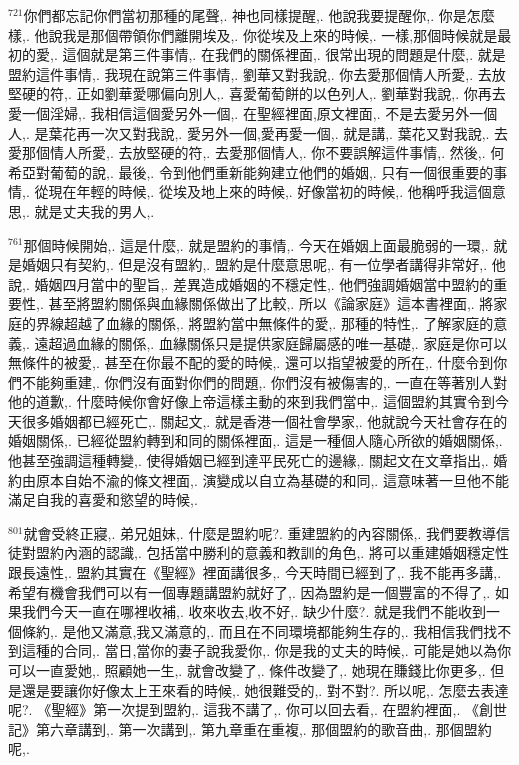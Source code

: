 \documentclass{book}
\begin{document}
$^{721}$你們都忘記你們當初那種的尾聲,.
神也同樣提醒,.
他說我要提醒你,.
你是怎麼樣,.
他說我是那個帶領你們離開埃及,.
你從埃及上來的時候,.
一樣,那個時候就是最初的愛,.
這個就是第三件事情,.
在我們的關係裡面,.
很常出現的問題是什麼,.
就是盟約這件事情,.
我現在說第三件事情,.
劉華又對我說,.
你去愛那個情人所愛,.
去放堅硬的符,.
正如劉華愛哪偏向別人,.
喜愛葡萄餅的以色列人,.
劉華對我說,.
你再去愛一個淫婦,.
我相信這個愛另外一個,.
在聖經裡面,原文裡面,.
不是去愛另外一個人,.
是葉花再一次又對我說,.
愛另外一個,愛再愛一個,.
就是講,.
葉花又對我說,.
去愛那個情人所愛,.
去放堅硬的符,.
去愛那個情人,.
你不要誤解這件事情,.
然後,.
何希亞對葡萄的說,.
最後,.
令到他們重新能夠建立他們的婚姻,.
只有一個很重要的事情,.
從現在年輕的時候,.
從埃及地上來的時候,.
好像當初的時候,.
他稱呼我這個意思,.
就是丈夫我的男人,.

$^{761}$那個時候開始,.
這是什麼,.
就是盟約的事情,.
今天在婚姻上面最脆弱的一環,.
就是婚姻只有契約,.
但是沒有盟約,.
盟約是什麼意思呢,.
有一位學者講得非常好,.
他說,.
婚姻四月當中的聖旨,.
差異造成婚姻的不穩定性,.
他們強調婚姻當中盟約的重要性,.
甚至將盟約關係與血緣關係做出了比較,.
所以《論家庭》這本書裡面,.
將家庭的界線超越了血緣的關係,.
將盟約當中無條件的愛,.
那種的特性,.
了解家庭的意義,.
遠超過血緣的關係,.
血緣關係只是提供家庭歸屬感的唯一基礎,.
家庭是你可以無條件的被愛,.
甚至在你最不配的愛的時候,.
還可以指望被愛的所在,.
什麼令到你們不能夠重建,.
你們沒有面對你們的問題,.
你們沒有被傷害的,.
一直在等著別人對他的道歉,.
什麼時候你會好像上帝這樣主動的來到我們當中,.
這個盟約其實令到今天很多婚姻都已經死亡,.
關起文,.
就是香港一個社會學家,.
他就說今天社會存在的婚姻關係,.
已經從盟約轉到和同的關係裡面,.
這是一種個人隨心所欲的婚姻關係,.
他甚至強調這種轉變,.
使得婚姻已經到達平民死亡的邊緣,.
關起文在文章指出,.
婚約由原本自始不渝的條文裡面,.
演變成以自立為基礎的和同,.
這意味著一旦他不能滿足自我的喜愛和慾望的時候,.

$^{801}$就會受終正寢,.
弟兄姐妹,.
什麼是盟約呢?.
重建盟約的內容關係,.
我們要教導信徒對盟約內涵的認識,.
包括當中勝利的意義和教訓的角色,.
將可以重建婚姻穩定性跟長遠性,.
盟約其實在《聖經》裡面講很多,.
今天時間已經到了,.
我不能再多講,.
希望有機會我們可以有一個專題講盟約就好了,.
因為盟約是一個豐富的不得了,.
如果我們今天一直在哪裡收補,.
收來收去,收不好,.
缺少什麼?.
就是我們不能收到一個條約,.
是他又滿意,我又滿意的,.
而且在不同環境都能夠生存的,.
我相信我們找不到這種的合同,.
當日,當你的妻子說我愛你,.
你是我的丈夫的時候,.
可能是她以為你可以一直愛她,.
照顧她一生,.
就會改變了,.
條件改變了,.
她現在賺錢比你更多,.
但是還是要讓你好像太上王來看的時候,.
她很難受的,.
對不對?.
所以呢,.
怎麼去表達呢?.
《聖經》第一次提到盟約,.
這我不講了,.
你可以回去看,.
在盟約裡面,.
《創世記》第六章講到,.
第一次講到,.
第九章重在重複,.
那個盟約的歌音曲,.
那個盟約呢,.
\end{document}
